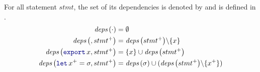 \begin{definition}
    \label{def:semantics:grfrp:theorems:equivalence:deps}

    For all statement $stmt$, the set of its dependencies is denoted by  and
    is defined in .
    \begin{align}
        \depSet{\skp}                       & = \emptyset \label{eq:semantics:grfrp:theorems:equivalence:deps:skip}                                                 \\
        \depSet{, stmt^+}         & = \depSet{stmt^+} \backslash \{x\} \label{eq:semantics:grfrp:theorems:equivalence:deps:import}                        \\
        \depSet{\export{x}, stmt^+}         & = \{x\} \cup \depSet{stmt^+} \label{eq:semantics:grfrp:theorems:equivalence:deps:export}                              \\
        \depSet{\decl{x^+}{\sigma}, stmt^+} & = \depSet{\sigma} \cup (\depSet{stmt^+} \backslash \{x^+\}) \label{eq:semantics:grfrp:theorems:equivalence:deps:decl}
    \end{align}
\end{definition}

